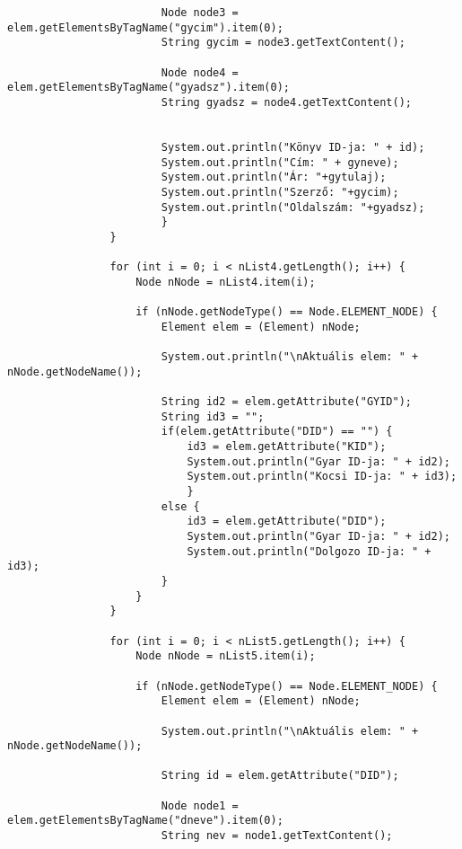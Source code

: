 \documentclass[14pt]{extarticle}
\begin{document}
\begin{normalsize}
\begin{verbatim}
		                Node node3 = elem.getElementsByTagName("gycim").item(0);
		                String gycim = node3.getTextContent();
		                
		                Node node4 = elem.getElementsByTagName("gyadsz").item(0);
		                String gyadsz = node4.getTextContent();


		                System.out.println("Könyv ID-ja: " + id);
		                System.out.println("Cím: " + gyneve);
		                System.out.println("Ár: "+gytulaj);
		                System.out.println("Szerző: "+gycim);
		                System.out.println("Oldalszám: "+gyadsz);
			            }
		        }
		        
		        for (int i = 0; i < nList4.getLength(); i++) {
		            Node nNode = nList4.item(i);

		            if (nNode.getNodeType() == Node.ELEMENT_NODE) {
		                Element elem = (Element) nNode;

		                System.out.println("\nAktuális elem: " + nNode.getNodeName());

		                String id2 = elem.getAttribute("GYID");
		                String id3 = "";
		                if(elem.getAttribute("DID") == "") {
		                	id3 = elem.getAttribute("KID");
		                	System.out.println("Gyar ID-ja: " + id2);
			                System.out.println("Kocsi ID-ja: " + id3);
			                }
		                else {
		                	id3 = elem.getAttribute("DID");
		                	System.out.println("Gyar ID-ja: " + id2);
			                System.out.println("Dolgozo ID-ja: " + id3);
		                }
		            }
		        }
		        
		        for (int i = 0; i < nList5.getLength(); i++) {
		            Node nNode = nList5.item(i);

		            if (nNode.getNodeType() == Node.ELEMENT_NODE) {
		                Element elem = (Element) nNode;

		                System.out.println("\nAktuális elem: " + nNode.getNodeName());

		                String id = elem.getAttribute("DID");

		                Node node1 = elem.getElementsByTagName("dneve").item(0);
		                String nev = node1.getTextContent();
		                

\end{verbatim}
\end{normalsize}
\end{document}

